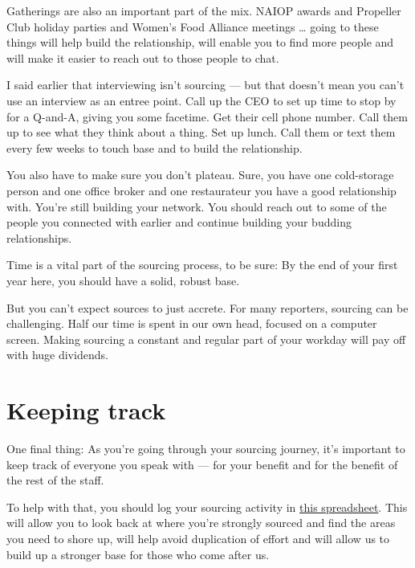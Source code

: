 \documentclass[
  11pt,
  american,
  letterpaperpaper,
  extrafontsizes,onecolumn,openright
  ]{memoir}
\begin{document}
Gatherings are also an important part of the mix. NAIOP awards and Propeller Club holiday parties and Women's Food Alliance meetings \ldots{} going to these things will help build the relationship, will enable you to find more people and will make it easier to reach out to those people to chat.

I said earlier that interviewing isn't sourcing --- but that doesn't mean you can't use an interview as an entree point. Call up the CEO to set up time to stop by for a Q-and-A, giving you some facetime. Get their cell phone number. Call them up to see what they think about a thing. Set up lunch. Call them or text them every few weeks to touch base and to build the relationship.

You also have to make sure you don't plateau. Sure, you have one cold-storage person and one office broker and one restaurateur you have a good relationship with. You're still building your network. You should reach out to some of the people you connected with earlier and continue building your budding relationships.

Time is a vital part of the sourcing process, to be sure: By the end of your first year here, you should have a solid, robust base.

But you can't expect sources to just accrete. For many reporters, sourcing can be challenging. Half our time is spent in our own head, focused on a computer screen. Making sourcing a constant and regular part of your workday will pay off with huge dividends.

\hypertarget{keeping-track}{%
\section*{Keeping track}\label{keeping-track}}

One final thing: As you're going through your sourcing journey, it's important to keep track of everyone you speak with --- for your benefit and for the benefit of the rest of the staff.

To help with that, you should log your sourcing activity in \href{https://acbj-my.sharepoint.com/:x:/r/personal/tgibbons_bizjournals_com/_layouts/15/Doc.aspx?sourcedoc=\%7B7DE7F8A6-944D-4A13-8CAC-40945F1D0FF7\%7D\&file=Sourcing.xlsx\&action=default\&mobileredirect=true}{this spreadsheet}. This will allow you to look back at where you're strongly sourced and find the areas you need to shore up, will help avoid duplication of effort and will allow us to build up a stronger base for those who come after us.
\end{document}
